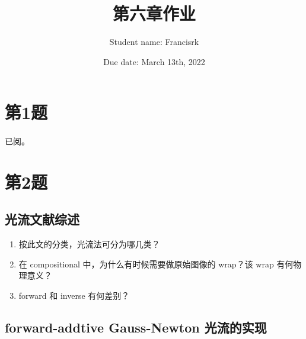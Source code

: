 \documentclass[40pt,a4paper，UTF8]{ctexart}
\title{第六章作业}
\author{Student name: Francisrk}
\date{Due date: March 13th, 2022}
\numberwithin{equation}{section}
\begin{document}
\maketitle   %

\section{第1题}
\paragraph{}
已阅。
\paragraph{}


\section{第2题}
\paragraph{}

\subsection{光流文献综述}
\begin{enumerate}
\item 按此文的分类，光流法可分为哪几类？


\item 在 compositional 中，为什么有时候需要做原始图像的 wrap？该 wrap 有何物理意义？


\item forward 和 inverse 有何差别？




\end{enumerate}


\subsection{forward-addtive Gauss-Newton 光流的实现}
\end{document}
